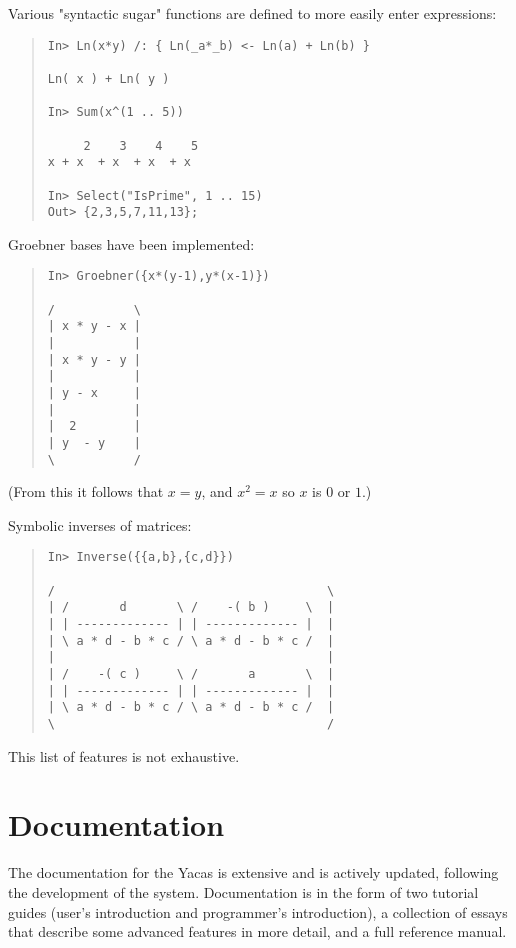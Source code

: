 \documentclass{llncs}
\begin{document}
Various "syntactic sugar" functions are defined to more easily enter
expressions:


\begin{quote}\small\begin{verbatim}
In> Ln(x*y) /: { Ln(_a*_b) <- Ln(a) + Ln(b) }

Ln( x ) + Ln( y )

In> Sum(x^(1 .. 5))

     2    3    4    5
x + x  + x  + x  + x 

In> Select("IsPrime", 1 .. 15)
Out> {2,3,5,7,11,13};

\end{verbatim}\end{quote}
Groebner bases \cite{GG99} have been implemented:


\begin{quote}\small\begin{verbatim}
In> Groebner({x*(y-1),y*(x-1)})

/           \
| x * y - x |
|           |
| x * y - y |
|           |
| y - x     |
|           |
|  2        |
| y  - y    |
\           /
\end{verbatim}\end{quote}
(From this it  follows that $x = y$, and $x ^{2} = x$ so $x$ is $0$ or $ 1
$.)


Symbolic inverses of matrices:


\begin{quote}\small\begin{verbatim}
In> Inverse({{a,b},{c,d}})

/                                      \
| /       d       \ /    -( b )     \  |
| | ------------- | | ------------- |  |
| \ a * d - b * c / \ a * d - b * c /  |
|                                      |
| /    -( c )     \ /       a       \  |
| | ------------- | | ------------- |  |
| \ a * d - b * c / \ a * d - b * c /  |
\                                      /
\end{verbatim}\end{quote}


This list of features is not exhaustive. 


\section{Documentation}
The documentation for the Yacas is extensive and is actively updated, following the development of the system.
Documentation is in the form of two tutorial guides (user's introduction and
programmer's introduction), a collection of essays that describe some
advanced features in more detail, and a full reference manual.
\end{document}
